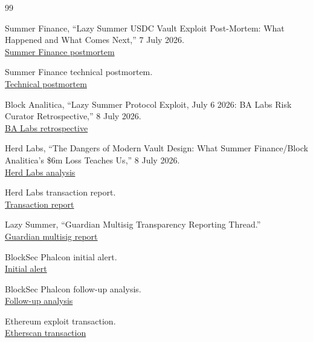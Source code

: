 \documentclass[11pt]{article}
\begin{document}
\begin{thebibliography}{99}

Summer Finance, ``Lazy Summer USDC Vault Exploit Post-Mortem: What Happened and What Comes Next,'' 7 July 2026.\\
\href{https://blog.summer.fi/lazy-summer-usdc-vault-exploit-post-mortem-what-happened-and-what-comes-next/}{Summer Finance postmortem}

Summer Finance technical postmortem.\\
\href{https://gist.github.com/halaprix/52bd5e32b35be100dc40ba30539e4169}{Technical postmortem}

Block Analitica, ``Lazy Summer Protocol Exploit, July 6 2026: BA Labs Risk Curator Retrospective,'' 8 July 2026.\\
\href{https://forum.summer.fi/t/lazy-summer-protocol-exploit-july-6-2026-ba-labs-risk-curator-retrospective/856}{BA Labs retrospective}

Herd Labs, ``The Dangers of Modern Vault Design: What Summer Finance/Block Analitica's \$6m Loss Teaches Us,'' 8 July 2026.\\
\href{https://paragraph.com/@herd-labs/the-dangers-of-modern-vault-design-what-summer-financeblock-analiticas-dollar6m-loss-teaches-us}{Herd Labs analysis}

Herd Labs transaction report.\\
\href{https://herd.eco/doubleclick/forum/019f426e-a452-7000-9770-f21cca833567}{Transaction report}

Lazy Summer, ``Guardian Multisig Transparency Reporting Thread.''\\
\href{https://forum.summer.fi/t/guardian-multisig-transparency-reporting-thread/787/5}{Guardian multisig report}

BlockSec Phalcon initial alert.\\
\href{https://x.com/Phalcon_xyz/status/2074019470918799737}{Initial alert}

BlockSec Phalcon follow-up analysis.\\
\href{https://x.com/Phalcon_xyz/status/2074089672775725208}{Follow-up analysis}

Ethereum exploit transaction.\\
\href{https://etherscan.io/tx/0x0db528c44f23fc7fa4544684a2fab81096450a14aae8bc89f42cd0592d43da12}{Etherscan transaction}


\end{thebibliography}
\end{document}
